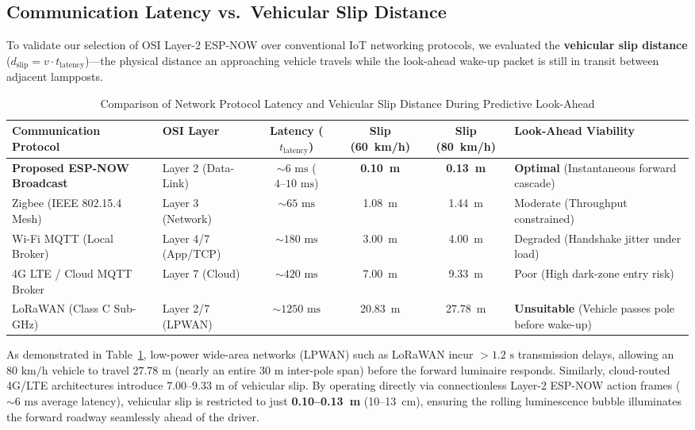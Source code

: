 \documentclass[11pt,a4paper]{article}
\begin{document}
\subsection{Communication Latency vs.\ Vehicular Slip Distance}
To validate our selection of OSI Layer-2 ESP-NOW over conventional IoT networking protocols, we evaluated the \textbf{vehicular slip distance} (\(d_{\text{slip}} = v \cdot t_{\text{latency}}\))---the physical distance an approaching vehicle travels while the look-ahead wake-up packet is still in transit between adjacent lampposts.

\begin{table}[tbp]
\centering
\caption{Comparison of Network Protocol Latency and Vehicular Slip Distance During Predictive Look-Ahead}
\label{tab:latency_comparison}
\small
\setlength{\tabcolsep}{4.5pt}
\begin{tabularx}{\textwidth}{>{\raggedright\arraybackslash}p{2.6cm}>{\raggedright\arraybackslash}p{2.0cm}ccc>{\raggedright\arraybackslash}X}
\toprule
\textbf{Communication Protocol} & \textbf{OSI Layer} & \textbf{Latency (\(t_{\text{latency}}\))} & \textbf{Slip (60~km/h)} & \textbf{Slip (80~km/h)} & \textbf{Look-Ahead Viability} \\
\midrule
\textbf{Proposed ESP-NOW Broadcast} \cite{espressif_espnow} & Layer 2 (Data-Link) & \(\sim 6\text{ ms}\) (\(4\text{--}10\text{ ms}\)) & \textbf{0.10~m} & \textbf{0.13~m} & \textbf{Optimal} (Instantaneous forward cascade) \\
Zigbee (IEEE 802.15.4 Mesh) & Layer 3 (Network) & \(\sim 65\text{ ms}\) & 1.08~m & 1.44~m & Moderate (Throughput constrained) \\
Wi-Fi MQTT (Local Broker) & Layer 4/7 (App/TCP) & \(\sim 180\text{ ms}\) & 3.00~m & 4.00~m & Degraded (Handshake jitter under load) \\
4G LTE / Cloud MQTT Broker & Layer 7 (Cloud) & \(\sim 420\text{ ms}\) & 7.00~m & 9.33~m & Poor (High dark-zone entry risk) \\
LoRaWAN (Class C Sub-GHz) & Layer 2/7 (LPWAN) & \(\sim 1250\text{ ms}\) & 20.83~m & 27.78~m & \textbf{Unsuitable} (Vehicle passes pole before wake-up) \\
\bottomrule
\end{tabularx}
\end{table}

As demonstrated in Table~\ref{tab:latency_comparison}, low-power wide-area networks (LPWAN) such as LoRaWAN incur $>1.2\text{ s}$ transmission delays, allowing an \(80\text{ km/h}\) vehicle to travel \(27.78\text{ m}\) (nearly an entire \(30\text{ m}\) inter-pole span) before the forward luminaire responds. Similarly, cloud-routed 4G/LTE architectures introduce \(7.00\text{--}9.33\text{ m}\) of vehicular slip. By operating directly via connectionless Layer-2 ESP-NOW action frames \cite{espressif_espnow} (\(\sim 6\text{ ms}\) average latency), vehicular slip is restricted to just \textbf{0.10--0.13~m} (10--13~cm), ensuring the rolling luminescence bubble illuminates the forward roadway seamlessly ahead of the driver.
\end{document}
